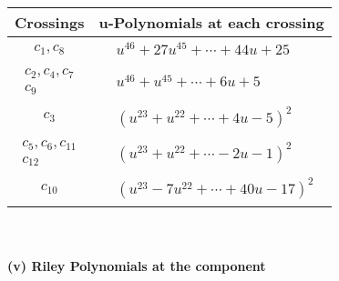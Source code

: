 \documentclass[1p]{elsarticle_modified}
\theoremstyle{definition}
\begin{document}
\begin{tabular}{m{50pt}|m{274pt}}
Crossings & \hspace{64pt}u-Polynomials at each crossing \\
\hline $$\begin{aligned}c_{1},c_{8}\end{aligned}$$&$\begin{aligned}
&u^{46}+27 u^{45}+\cdots+44 u+25
\end{aligned}$\\
\hline $$\begin{aligned}c_{2},c_{4},c_{7}\\c_{9}\end{aligned}$$&$\begin{aligned}
&u^{46}+u^{45}+\cdots+6 u+5
\end{aligned}$\\
\hline $$\begin{aligned}c_{3}\end{aligned}$$&$\begin{aligned}
&(u^{23}+u^{22}+\cdots+4 u-5)^{2}
\end{aligned}$\\
\hline $$\begin{aligned}c_{5},c_{6},c_{11}\\c_{12}\end{aligned}$$&$\begin{aligned}
&(u^{23}+u^{22}+\cdots-2 u-1)^{2}
\end{aligned}$\\
\hline $$\begin{aligned}c_{10}\end{aligned}$$&$\begin{aligned}
&(u^{23}-7 u^{22}+\cdots+40 u-17)^{2}
\end{aligned}$\\
\hline
\end{tabular}\\~\\
\newpage\renewcommand{\arraystretch}{1}
\flushleft \textbf{(v) Riley Polynomials at the component}\newline \\
\end{document}
